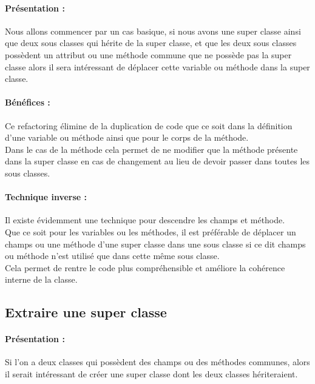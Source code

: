 \documentclass[a4paper,twoside,12pt,openright]{report}
\begin{document}
\paragraph{Présentation :}
Nous allons commencer par un cas basique, si nous avons une super classe ainsi que deux sous classes qui hérite de la super classe, et que les deux sous classes possèdent un attribut ou une méthode commune que ne possède pas la super classe alors il sera intéressant de déplacer cette variable ou méthode dans la super classe.\\

\paragraph{Bénéfices :}
Ce refactoring élimine de la duplication de code que ce soit dans la définition d'une variable ou méthode ainsi que pour le corps de la méthode.\\
Dans le cas de la méthode cela permet de ne modifier que la méthode présente dans la super classe en cas de changement au lieu de devoir passer dans toutes les sous classes.\\

\paragraph{Technique inverse :}
Il existe évidemment une technique pour descendre les champs et méthode.\\
Que ce soit pour les variables ou les méthodes, il est préférable de déplacer un champs ou une méthode d'une super classe dans une sous classe si ce dit champs ou méthode n'est utilisé que dans cette même sous classe.\\
Cela permet de rentre le code plus compréhensible et améliore la cohérence interne de la classe.\\


\subsection{Extraire une super classe}
\paragraph{Présentation :}
Si l'on a deux classes qui possèdent des champs ou des méthodes communes, alors il serait intéressant de créer une super classe dont les deux classes hériteraient.\\
\end{document}
